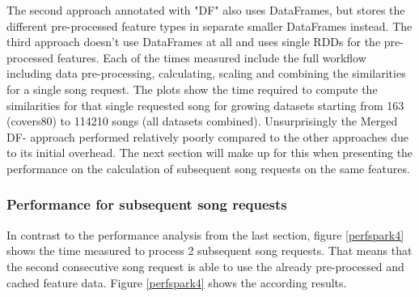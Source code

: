\noindent The second approach annotated with "DF" also uses DataFrames, but stores the different pre-processed feature types in separate smaller DataFrames instead. The third approach doesn't use DataFrames at all and uses single RDDs for the pre-processed features. Each of the times measured include the full workflow including data pre-processing, calculating, scaling and combining the similarities for a single song request. The plots show the time required to compute the similarities for that single requested song for growing datasets starting from 163 (covers80) to 114210 songs (all datasets combined). 
\noindent Unsurprisingly the Merged DF- approach performed relatively poorly compared to the other approaches due to its initial overhead. The next section will make up for this when presenting the performance on the calculation of subsequent song requests on the same features.

\subsubsection{Performance for subsequent song requests}

In contrast to the performance analysis from the last section, figure \ref{perfspark4} shows the time measured to process 2 subsequent song requests. That means that the second consecutive song request is able to use the already pre-processed and cached feature data. Figure \ref{perfspark4} shows the according results.\\


